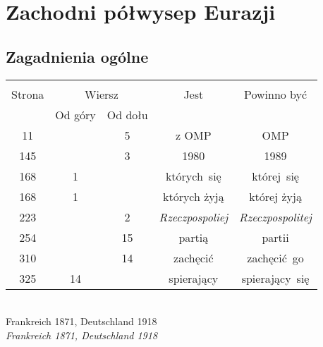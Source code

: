 \documentclass[a4paper,11pt]{article}
\begin{document}
\vspace{\spaceTwo}





\section{Zachodni półwysep Eurazji}

\vspace{\spaceTwo}



\subsection{Zagadnienia ogólne}

\vspace{\spaceThree}






\begin{center}
  \begin{tabular}{|c|c|c|c|c|}
    \hline
    & \multicolumn{2}{c|}{} & & \\
    Strona & \multicolumn{2}{c|}{Wiersz} & Jest
                              & Powinno być \\ \cline{2-3}
    & Od góry & Od dołu & & \\
    \hline
    11  & &  5 & z OMP & OMP \\
    145 & &  3 & 1980 & 1989 \\
    168 &  1 & & których~się & której~się \\
    168 &  1 & & których żyją & której żyją \\
    223 & &  2 & \emph{Rzeczpospoliej} & \emph{Rzeczpospolitej} \\
    254 & & 15 & partią & partii \\
    310 & & 14 & zachęcić & zachęcić~go \\
    325 & 14 & & spierający & spierający~się \\
    \hline
  \end{tabular}
\end{center}
\noi 
{} \\
\Jest Frankreich 1871, Deutschland 1918 \\
\Pow  \emph{Frankreich 1871, Deutschland 1918} \\
\end{document}
